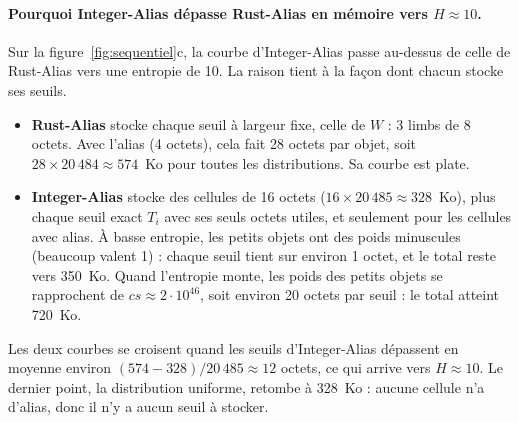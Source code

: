 \documentclass[11pt,a4paper]{article}
\newcommand{\cs}{\mathit{cs}}
\begin{document}
\paragraph{Pourquoi Integer-Alias dépasse Rust-Alias en mémoire vers $H \approx 10$.}
Sur la figure~\ref{fig:sequentiel}c, la courbe d'Integer-Alias passe au-dessus de celle
de Rust-Alias vers une entropie de 10. La raison tient à la façon dont chacun stocke ses
seuils.
\begin{itemize}
\item \textbf{Rust-Alias} stocke chaque seuil à largeur fixe, celle de $W$ : 3 limbs de
  8 octets. Avec l'alias (4 octets), cela fait 28 octets par objet, soit
  $28 \times 20\,484 \approx 574$~Ko pour toutes les distributions. Sa courbe est plate.
\item \textbf{Integer-Alias} stocke des cellules de 16 octets ($16 \times 20\,485
  \approx 328$~Ko), plus chaque seuil exact $T_i$ avec ses seuls octets utiles, et
  seulement pour les cellules avec alias. À basse entropie, les petits objets ont des
  poids minuscules (beaucoup valent 1) : chaque seuil tient sur environ 1 octet, et le
  total reste vers 350~Ko. Quand l'entropie monte, les poids des petits objets se
  rapprochent de $\cs \approx 2\cdot 10^{46}$, soit environ 20 octets par seuil : le
  total atteint 720~Ko.
\end{itemize}
Les deux courbes se croisent quand les seuils d'Integer-Alias dépassent en moyenne
environ $(574 - 328)/20\,485 \approx 12$ octets, ce qui arrive vers $H \approx 10$.
Le dernier point, la distribution uniforme, retombe à 328~Ko : aucune cellule n'a
d'alias, donc il n'y a aucun seuil à stocker.
\end{document}
